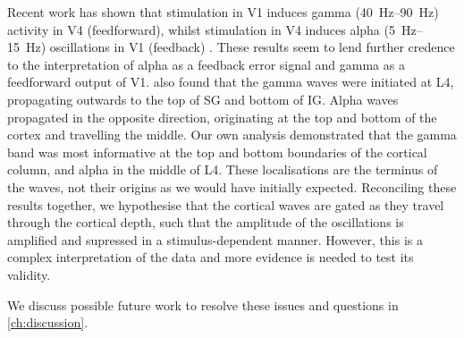 Recent work has shown that stimulation in \ac{V1} induces gamma (\SIrange{40}{90}{Hz}) activity in \ac{V4} (feedforward), whilst stimulation in \ac{V4} induces alpha (\SIrange{5}{15}{Hz}) oscillations in \ac{V1} (feedback) \citep{VanKerkoerle2014}.
These results seem to lend further credence to the interpretation of alpha as a feedback error signal and gamma as a feedforward output of \ac{V1}.
\citet{VanKerkoerle2014} also found that the gamma waves were initiated at \ac{L4}, propagating outwards to the top of \ac{SG} and bottom of \ac{IG}.
Alpha waves propagated in the opposite direction, originating at the top and bottom of the cortex and travelling the middle.
Our own analysis demonstrated that the gamma band was most informative at the top and bottom boundaries of the cortical column, and alpha in the middle of \ac{L4}.
These localisations are the terminus of the \citet{VanKerkoerle2014} waves, not their origins as we would have initially expected.
Reconciling these results together, we hypothesise that the cortical waves are gated as they travel through the cortical depth, such that the amplitude of the oscillations is amplified and supressed in a stimulus-dependent manner.
However, this is a complex interpretation of the data and more evidence is needed to test its validity.

We discuss possible future work to resolve these issues and questions in \autoref{ch:discussion}.
